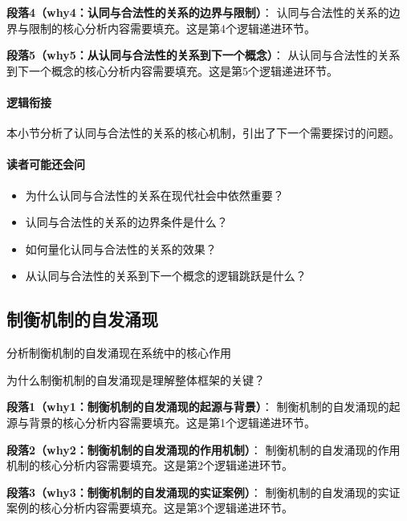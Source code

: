 \documentclass[../main.tex]{subfiles}
\begin{document}
{{\textbf{段落4（why4：认同与合法性的关系的边界与限制）}：
认同与合法性的关系的边界与限制的核心分析内容需要填充。这是第4个逻辑递进环节。


\textbf{段落5（why5：从认同与合法性的关系到下一个概念）}：
从认同与合法性的关系到下一个概念的核心分析内容需要填充。这是第5个逻辑递进环节。


\paragraph*{逻辑衔接}
本小节分析了认同与合法性的关系的核心机制，引出了下一个需要探讨的问题。

\paragraph*{读者可能还会问}
\begin{itemize}
\item 为什么认同与合法性的关系在现代社会中依然重要？
\item 认同与合法性的关系的边界条件是什么？
\item 如何量化认同与合法性的关系的效果？
\item 从认同与合法性的关系到下一个概念的逻辑跳跃是什么？
\end{itemize}


\subsection{制衡机制的自发涌现}

\begin{motivation}
分析制衡机制的自发涌现在系统中的核心作用
\end{motivation}

\begin{logicmap}
[逻辑链占位]
\end{logicmap}

\begin{questionbox}
为什么制衡机制的自发涌现是理解整体框架的关键？
\end{questionbox}

\textbf{段落1（why1：制衡机制的自发涌现的起源与背景）}：
制衡机制的自发涌现的起源与背景的核心分析内容需要填充。这是第1个逻辑递进环节。


\textbf{段落2（why2：制衡机制的自发涌现的作用机制）}：
制衡机制的自发涌现的作用机制的核心分析内容需要填充。这是第2个逻辑递进环节。


\textbf{段落3（why3：制衡机制的自发涌现的实证案例）}：
制衡机制的自发涌现的实证案例的核心分析内容需要填充。这是第3个逻辑递进环节。


}}
\end{document}
